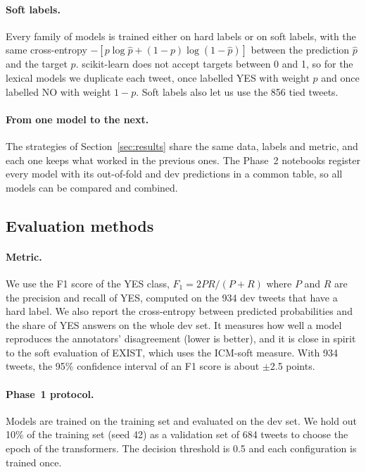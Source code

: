 \documentclass[pdflatex,sn-mathphys-num]{sn-jnl}
\begin{document}
\paragraph{Soft labels.} Every family of models is trained either on hard labels or on soft labels, with the same cross-entropy $-\left[p \log \hat p + (1-p)\log(1-\hat p)\right]$ between the prediction $\hat p$ and the target $p$. scikit-learn does not accept targets between 0 and 1, so for the lexical models we duplicate each tweet, once labelled YES with weight $p$ and once labelled NO with weight $1-p$. Soft labels also let us use the 856 tied tweets.

\paragraph{From one model to the next.} The strategies of Section~\ref{sec:results} share the same data, labels and metric, and each one keeps what worked in the previous ones. The Phase~2 notebooks register every model with its out-of-fold and dev predictions in a common table, so all models can be compared and combined.

\subsection{Evaluation methods}\label{sec:eval}

\paragraph{Metric.} We use the F1 score of the YES class, $F_1 = 2PR/(P+R)$ where $P$ and $R$ are the precision and recall of YES, computed on the 934 dev tweets that have a hard label. We also report the cross-entropy between predicted probabilities and the share of YES answers on the whole dev set. It measures how well a model reproduces the annotators' disagreement (lower is better), and it is close in spirit to the soft evaluation of EXIST, which uses the ICM-soft measure. With 934 tweets, the 95\% confidence interval of an F1 score is about $\pm$2.5 points.

\paragraph{Phase~1 protocol.} Models are trained on the training set and evaluated on the dev set. We hold out 10\% of the training set (seed 42) as a validation set of 684 tweets to choose the epoch of the transformers. The decision threshold is 0.5 and each configuration is trained once.
\end{document}
